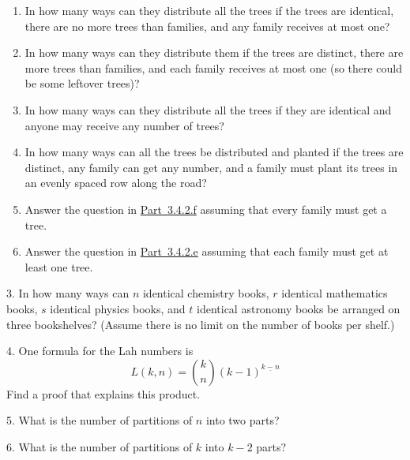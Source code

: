 \documentclass[10pt,]{book}
\theoremstyle{plain}
\theoremstyle{definition}
\theoremstyle{definition}
\numberwithin{equation}{chapter}
\newcommand{\importantarrow}{\Rightarrow}
\begin{document}
\begin{exerciselist}
\begin{enumerate}[label=(\alph*)]
\item\hypertarget{li-52}{}In how many ways can they distribute all the trees if the trees are identical, there are no more trees than families,   and any family receives at most one?%
\item\hypertarget{li-53}{}In how many ways can they distribute them if the trees are distinct, there are more trees than families, and each family receives at most one (so there could be some leftover trees)?%
\item\hypertarget{multisetproblem}{}In how many ways can they distribute all the trees if they are identical and anyone may receive any number of trees?%
\item\hypertarget{orderedfunctionproblem}{}In how many ways can all the trees be distributed and planted if the trees are distinct, any family can get any number, and a family must plant its trees in an evenly spaced row along the road?%
\item\hypertarget{li-56}{}Answer the question in \hyperlink{orderedfunctionproblem}{Part~3.4.2.f} assuming that every family must get a tree.%
\item\hypertarget{li-57}{}Answer the question in \hyperlink{multisetproblem}{Part~3.4.2.e} assuming that each family must get at least one tree.%
\end{enumerate}
%
\par\smallskip
\item[3.]\marginsymbol[-1em]{} \hypertarget{exercise-25}{}In how many ways can \(n\) identical chemistry books, \(r\) identical mathematics books, \(s\) identical physics books, and \(t\) identical astronomy books be arranged on three bookshelves?  (Assume there is no limit on the number of books per shelf.)%
\par\smallskip
\item[4.]\marginsymbol[-1em]{\pdftooltip{$\importantarrow$}{especially interesting}} \hypertarget{exercise-26}{}One formula for the Lah numbers is%
\begin{equation*}
L(k,n) = \binom{k}{n}(k-1)^{\underline{k-n}}
\end{equation*}
Find a proof that explains this product.%
\par\smallskip
\item[5.]\marginsymbol[-1em]{} \hypertarget{exercise-27}{}What is the number of partitions of \(n\) into two parts?%
\par\smallskip
\item[6.]\marginsymbol[-1em]{} \hypertarget{partitions-k-2-parts}{}What is the number of partitions of \(k\) into \(k - 2\) parts?%

\end{exerciselist}
\end{document}
